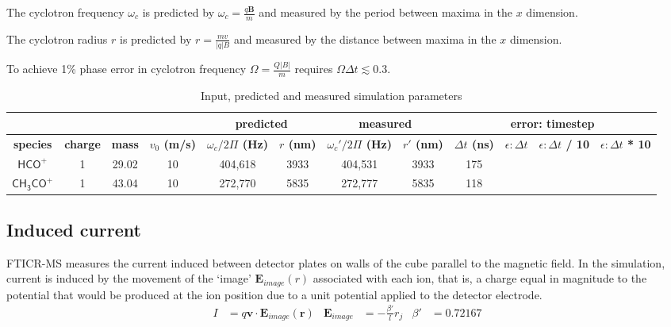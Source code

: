 \documentclass[10pt,conference,onecolumn]{IEEEtran}
\begin{document}
The cyclotron frequency $\omega_c$ is predicted by $\omega_c = \frac{q\mathbf{B}}{m}$\cite{Guan1995} and measured by the period between maxima in the $x$ dimension.

The cyclotron radius $r$ is predicted by $r = \frac{m v}{|q| B}$ and measured by the distance between maxima in the $x$ dimension.

To achieve 1\% phase error in cyclotron frequency $\Omega = \frac{Q|B|}{m}$  requires $\Omega \Delta t \lesssim 0.3$\cite{Birdsall1985,Patacchini2009}.

\begin{table}[htbp]
 \centering	  	  
 \caption{Input, predicted and measured simulation parameters}
\label{tab:params}
\begin{tabular}{c|c|c|c|c|c|c|c|c|c|c|c}
 \hline \hline
 \multicolumn{4}{|c|}{ } & \multicolumn{2}{|c|}{\textbf{predicted}} & \multicolumn{2}{|c|}{\textbf{measured}} & \multicolumn{4}{|c|}{\textbf{error: timestep}} \\ 
 \hline
 \textbf{species} & \textbf{charge} & \textbf{mass} & \textbf{$v_0$ (m/s)} & \textbf{$\omega_c / 2\Pi$ (Hz)} & \textbf{$r$ (nm)} & \textbf{$\omega_c' / 2\Pi$ (Hz)}  & \textbf{$r'$ (nm)} & \textbf{$\Delta t$ (ns)} & \textbf{$\epsilon: \Delta t$}& \textbf{$\epsilon: \Delta t$ / 10} & \textbf{$\epsilon: \Delta t$ * 10}\\ 
 \hline
 $\mathsf{HCO^+}$ & 1 & 29.02 & 10 & 404,618 & 3933 & 404,531 & 3933 & 175 & \\
 $\mathsf{CH_3CO^+}$ & 1 & 43.04 & 10 & 272,770 & 5835 & 272,777 & 5835 & 118 & \\
 \hline \hline
\end{tabular}
\end{table}

\subsection{Induced current}

FTICR-MS measures the current induced between detector plates on walls of the cube parallel to the magnetic field.
In the simulation, current is induced by the movement of the `image' $\mathbf{E}_{image}(r)$ associated with each ion, that is, a charge equal in magnitude to the potential that would be produced at the ion position due to a unit potential applied to the detector electrode\cite{Guan1995}.
\begin{align}
I &= q\mathbf{v} \cdot \mathbf{E}_{image}(\mathbf{r}) & \mathbf{E}_{image} &= - \frac{\beta'}{l} r_j & \beta' &= 0.72167
\end{align}
\end{document}
